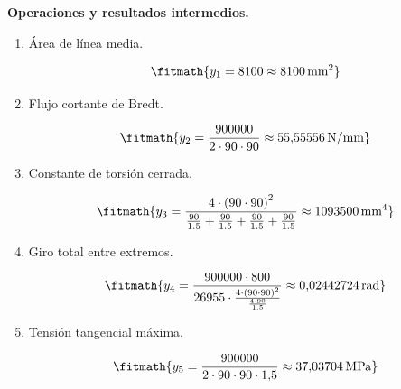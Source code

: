 \noindent\textbf{Operaciones y resultados intermedios.}

\begin{enumerate}

\item Área de línea media.

\[\fitmath{y_{1}=8100\approx 8100\,\mathrm{mm^{2}}}\]

\item Flujo cortante de Bredt.

\[\fitmath{y_{2}=\frac{900000}{2\cdot 90\cdot 90}\approx 55{,}55556\,\mathrm{N/mm}}\]

\item Constante de torsión cerrada.

\[\fitmath{y_{3}=\frac{4\cdot {\left(90\cdot 90\right)}^{2}}{\frac{90}{1.5}+\frac{90}{1.5}+\frac{90}{1.5}+\frac{90}{1.5}}\approx 1093500\,\mathrm{mm^{4}}}\]

\item Giro total entre extremos.

\[\fitmath{y_{4}=\frac{900000\cdot 800}{26955\cdot \frac{4\cdot {\left(90\cdot 90\right)}^{2}}{\frac{4\cdot 90}{1.5}}}\approx 0{,}02442724\,\mathrm{rad}}\]

\item Tensión tangencial máxima.

\[\fitmath{y_{5}=\frac{900000}{2\cdot 90\cdot 90\cdot 1{,}5}\approx 37{,}03704\,\mathrm{MPa}}\]

\end{enumerate}
